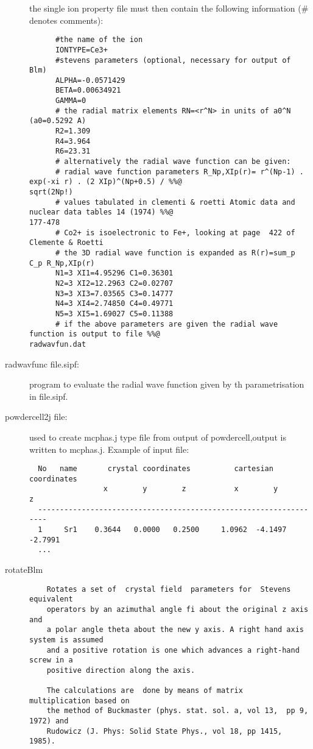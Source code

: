 \begin{description}
                      the single ion property file must then contain the following
                      information (\# denotes comments):
\begin{verbatim}
      #the name of the ion
      IONTYPE=Ce3+
      #stevens parameters (optional, necessary for output of Blm)
      ALPHA=-0.0571429
      BETA=0.00634921
      GAMMA=0
      # the radial matrix elements RN=<r^N> in units of a0^N (a0=0.5292 A)
      R2=1.309
      R4=3.964
      R6=23.31
      # alternatively the radial wave function can be given:
      # radial wave function parameters R_Np,XIp(r)= r^(Np-1) . exp(-xi r) . (2 XIp)^(Np+0.5) / %%@
sqrt(2Np!)  
      # values tabulated in clementi & roetti Atomic data and nuclear data tables 14 (1974) %%@
177-478
      # Co2+ is isoelectronic to Fe+, looking at page  422 of Clemente & Roetti 
      # the 3D radial wave function is expanded as R(r)=sum_p C_p R_Np,XIp(r)
      N1=3 XI1=4.95296 C1=0.36301 
      N2=3 XI2=12.2963 C2=0.02707 
      N3=3 XI3=7.03565 C3=0.14777
      N4=3 XI4=2.74850 C4=0.49771 
      N5=3 XI5=1.69027 C5=0.11388
      # if the above parameters are given the radial wave function is output to file %%@
radwavfun.dat                 
\end{verbatim}                      
\item[\prg radwavfunc\index{radwavfunc} file.sipf:] program to evaluate the radial wave function
given by th parametrisation in file.sipf.
\item [\prg powdercell2j\index{powdercell2j} file:]     used to create mcphas.j type file from %
output of powdercell,output is written to mcphas.j.  Example of input file:
\begin{verbatim}
  No   name       crystal coordinates          cartesian coordinates
                 x        y        z           x        y        z
  ------------------------------------------------------------------
  1     Sr1    0.3644   0.0000   0.2500     1.0962  -4.1497  -2.7991
  ...
  \end{verbatim}
\item [\prg rotateBlm\index{rotateBlm}]
  \begin{verbatim}
    Rotates a set of  crystal field  parameters for  Stevens equivalent
    operators by an azimuthal angle fi about the original z axis and
    a polar angle theta about the new y axis. A right hand axis system is assumed
    and a positive rotation is one which advances a right-hand screw in a
    positive direction along the axis.

    The calculations are  done by means of matrix  multiplication based on
    the method of Buckmaster (phys. stat. sol. a, vol 13,  pp 9, 1972) and
    Rudowicz (J. Phys: Solid State Phys., vol 18, pp 1415, 1985).   


\end{verbatim}
\end{description}
